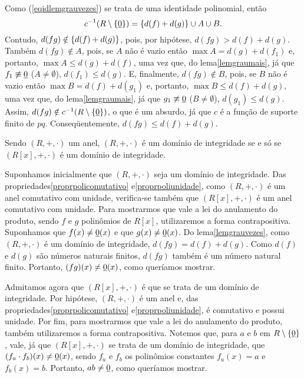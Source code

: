 \begin{dem}
\begin{equation*}
  \end{equation*}
  Como (\ref{eqidlemgrauvezes}) se trata de uma
  identidade polinomial, então
  \begin{equation*}
    c^{-1}(R\setminus\left\{ \underline{0} \right\}) = \left\{ d(f)+d(g) \right\} \cup A\cup B\mathrm{.}
  \end{equation*}
  Contudo, $d(fg)\notin \left\{ d(f)+d(g) \right\}$, pois, por hipótese,
  $d(fg)>d(f)+d(g)$. Também $d(fg)\notin A$, pois, se $A$ não é vazio
  então $\max{A}=d(g)+d(f_1)$ e, portanto, $\max{A}\leq d(g)+d(f)$, uma
  vez que, do
  lema\xspace\ref{lemgraumais}, já que $f_1\not\equiv\underline{0}$
  ($A\neq\emptyset$), $d(f_1)\leq d(g)$. E, finalmente, $d(fg)\notin B$,
  pois, se $B$ não é vazio
  então $\max{B}=d(f)+d(g_1)$ e, portanto, $\max{B}\leq d(f)+d(g)$, uma
  vez que, do
  lema\xspace\ref{lemgraumais}, já que $g_1\not\equiv\underline{0}$
  ($B\neq\emptyset$), $d(g_1)\leq d(g)$. Assim, $d(fg)\notin
  c^{-1}(R\setminus\left\{ \underline{0} \right\})$, o que é um absurdo, já que $c$ é a
  função de suporte finito de $pq$. Conseqüentemente, $d(fg)\leq
  d(f)+d(g)$.
\end{dem}

\begin{Propr}\label{proprpolidi}
  Sendo $(R,+,\cdot)$ um anel,
  $(R,+,\cdot)$ é um domínio de integridade se e só se $(R[x],+,\cdot)$
  é um domínio de integridade.
\end{Propr}

\begin{dem}
  Suponhamos inicialmente que $(R,+,\cdot)$ seja um domínio de
  integridade.
  Das propriedades\xspace\ref{proprpolicomutativo}
  e\xspace\ref{proprpoliunidade}, como $(R,+,\cdot)$ é um anel
  comutativo com unidade, verifica-se também que $(R[x],+,\cdot)$ é um
  anel comutativo com unidade.
  Para mostrarmos que vale a lei do anulamento do produto,
  sendo $f$ e $g$
  polinômios de $R[x]$,
  utilizaremos a forma contrapositiva. Suponhamos que $f(x)\neq
  \underline{0}(x)$ e que $g(x)\neq\underline{0}(x)$.
  Do lema\xspace\ref{lemgrauvezes}, como $(R,+,\cdot)$ é um domínio de
  integridade, $d(fg)=d(f)+d(g)$. Como $d(f)$ e
  $d(g)$ são números naturais finitos, $d(fg)$ também é um número
  natural finito. Portanto, $(fg)(x)\neq \underline{0}(x)$, como queríamos
  mostrar.

  Admitamos agora que $(R[x],+,\cdot)$ é que se trata de um domínio de
  integridade. Por hipótese, $(R,+,\cdot)$ é um anel e, das
  propriedades\xspace\ref{proprpolicomutativo}
  e\xspace\ref{proprpoliunidade}, é comutativo e possui unidade. Por
  fim, para mostrarmos que vale a lei do anulamento do produto, também
  utilizaremos a forma contrapositiva. Notemos que, para $a$ e $b$ em
  $R\setminus\left\{ \underline{0} \right\}$,
  vale, já que $(R[x],+,\cdot)$ se trata de um domínio de
  integridade,
  que $(f_a\cdot f_b)(x)\neq \underline{0}(x)$, sendo $f_a$ e $f_b$ os
  polinômios constantes $f_a(x)=a$ e $f_b(x) = b$. Portanto,
  $ab\neq\underline{0}$, como queríamos mostrar.
\end{dem}

